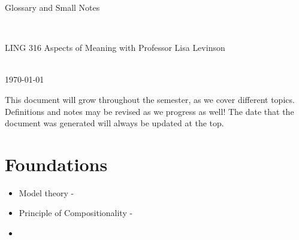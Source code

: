 \documentclass[12pt,letterpaper]{article}
\begin{document}
\begin{center}
\begin{Large}Glossary and Small Notes\end{Large}\\
\vspace{.2in}
\begin{large}LING 316 Aspects of Meaning with Professor Lisa Levinson\end{large}\\
\vspace{.2in}
\today
\end{center}

This document will grow throughout the semester, as we cover different topics. Definitions and notes may be revised as we progress as well! The date that the document was generated will always be updated at the top.

\section{Foundations}

\begin{itemize}
  \item Model theory -
  \item Principle of Compositionality - \citep{frege1892}
  \item    
\end{itemize}


%





\setlength{\bibsep}{0ex}


\end{document}
